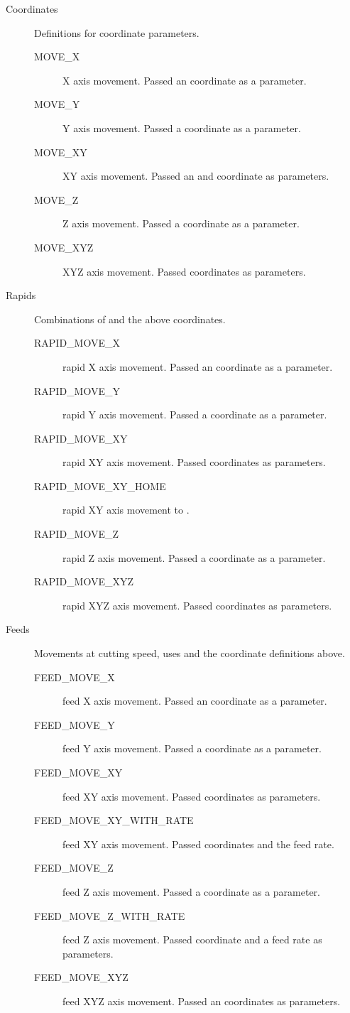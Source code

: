 \documentclass[11pt]{book}
\begin{document}
\begin{description}
\item[Coordinates] Definitions for coordinate parameters.
\begin{description}
	\item[MOVE\_{}X] X axis movement. Passed an  coordinate as a parameter.
	\item[MOVE\_{}Y] Y axis movement. Passed a  coordinate as a parameter.
	\item[MOVE\_{}XY] XY axis movement. Passed an  and  coordinate as parameters.
	\item[MOVE\_{}Z] Z axis movement. Passed a  coordinate as a parameter.
	\item[MOVE\_{}XYZ] XYZ axis movement. Passed  coordinates as parameters.
\end{description}

\item[Rapids] Combinations of  and the above coordinates.
\begin{description}
	\item[RAPID\_{}MOVE\_{}X] rapid X axis movement. Passed an  coordinate as a parameter.
	\item[RAPID\_{}MOVE\_{}Y] rapid Y axis movement. Passed a  coordinate as a parameter.
	\item[RAPID\_{}MOVE\_{}XY] rapid XY axis movement. Passed  coordinates as parameters.
	\item[RAPID\_{}MOVE\_{}XY\_{}HOME] rapid XY axis movement to .
	\item[RAPID\_{}MOVE\_{}Z] rapid Z axis movement. Passed a  coordinate as a parameter.
	\item[RAPID\_{}MOVE\_{}XYZ] rapid XYZ axis movement. Passed  coordinates as parameters.
\end{description}

\item[Feeds] Movements at cutting speed, uses  and the coordinate definitions above.
\begin{description}
	\item[FEED\_{}MOVE\_{}X] feed X axis movement. Passed an  coordinate as a parameter.
	\item[FEED\_{}MOVE\_{}Y] feed Y axis movement. Passed a  coordinate as a parameter.
	\item[FEED\_{}MOVE\_{}XY] feed XY axis movement. Passed  coordinates as parameters.
	\item[FEED\_{}MOVE\_{}XY\_{}WITH\_{}RATE] feed XY axis movement. Passed  coordinates and the feed rate.
	\item[FEED\_{}MOVE\_{}Z] feed Z axis movement. Passed a  coordinate as a parameter.
	\item[FEED\_{}MOVE\_{}Z\_{}WITH\_{}RATE] feed Z axis movement. Passed  coordinate and a feed rate as parameters.
	\item[FEED\_{}MOVE\_{}XYZ] feed XYZ axis movement. Passed an  coordinates as parameters.
\end{description}


\end{description}
\end{document}
